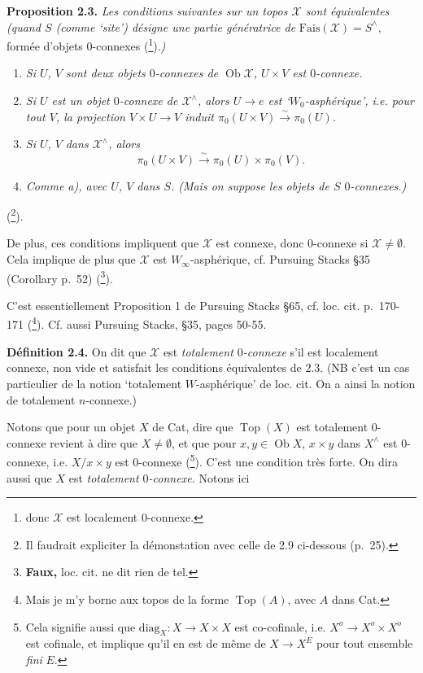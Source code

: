 \documentclass[11pt]{article}
\newcommand{\printedpage}[1]{\marginpar{\footnotesize p.~#1}}
\newcommand{\msp}[1]{\marginpar{\footnotesize [#1]}}
\newcommand{\sX}{\mathscr{X}} %
\begin{document}
\noindent\textbf{Proposition 2.3.} \textit{Les conditions suivantes sur un topos $\sX$ sont équivalentes (quand $S$ (comme `site') désigne une partie génératrice de} $\mathrm{Fais}(\sX) = S^{\wedge}$, formée d'objets 0-connexes (\footnote[23]{donc $\sX$ est localement 0-connexe.}).\textit{)}
\begin{enumerate}[label={},leftmargin=3em]
\item[\textit{a)}] \textit{Si $U$, $V$ sont deux objets $0$-connexes de $\operatorname{Ob} \sX$, $U \times V$ est $0$-connexe.}
\item[\textit{b)}] \textit{Si $U$ est un objet $0$-connexe de $\sX^{\wedge}$, alors $U \longrightarrow e$ est `$W_0$-asphérique', i.e. pour tout $V$, la projection $V \times U \longrightarrow V$ induit $\pi_0(U \times V) \xrightarrow{\sim} \pi_0(U)$.}
\item[\textit{c)}] \textit{Si $U$, $V$} \textit{dans $\sX^{\wedge}$, alors}
\[
\pi_0(U \times V) \xrightarrow{\sim} \pi_0(U) \times \pi_0(V).
\]
\item[\textit{d)}] \textit{Comme a), avec $U$, $V$ dans $S$. (Mais on suppose les objets de $S$ $0$-connexes.)}
\end{enumerate}
\noindent(\footnote[24]{Il faudrait expliciter la démonstation avec celle de 2.9 ci-dessous (p.~25).}). %

\msp{page 18}

\noindent De plus, ces conditions impliquent que $\sX$ est connexe, donc 0-connexe si $\sX \neq \emptyset$. Cela implique de plus que $\sX$ est $W_{\infty}$-asphérique, cf. Pursuing Stacks §35 (Corollary p.~52) (\footnote[25]{\textbf{Faux,} loc. cit. ne dit rien de tel.}).

C'est essentiellement Proposition 1 de Pursuing Stacks §65, cf. loc. cit. p.~170-171 (\footnote[26]{Mais je m'y borne aux topos de la forme $\operatorname{Top}(A)$, avec $A$ dans Cat.}). Cf. aussi Pursuing Stacks, §35, pages 50-55.

\printedpage{12}

\noindent\textbf{Définition 2.4.} On dit que $\sX$ est \textit{totalement $0$-connexe} s'il est localement connexe, non vide et satisfait les conditions équivalentes de 2.3. (NB c'est un cas particulier de la notion `totalement $W$-asphérique' de loc. cit. On a ainsi la notion de totalement $n$-connexe.)

Notons que pour un objet $X$ de Cat, dire que $\operatorname{Top}(X)$ est totalement 0-connexe revient à dire que $X \neq \emptyset$, et que pour $x, y \in \operatorname{Ob} X$, $x \times y$ dans $X^{\wedge}$ est 0-connexe, i.e. $X/x \times y$ est 0-connexe (\footnote[27]{Cela signifie aussi que $\mathrm{diag}_X : X \longrightarrow X \times X$ est co-cofinale, i.e. $X^o \longrightarrow X^o \times X^o$ est cofinale, et implique qu'il en est de même de $X \longrightarrow X^E$ pour tout ensemble \textit{fini} $E$.}). C'est une condition très forte. On dira aussi que $X$ est \textit{totalement $0$-connexe.} Notons ici
\end{document}
